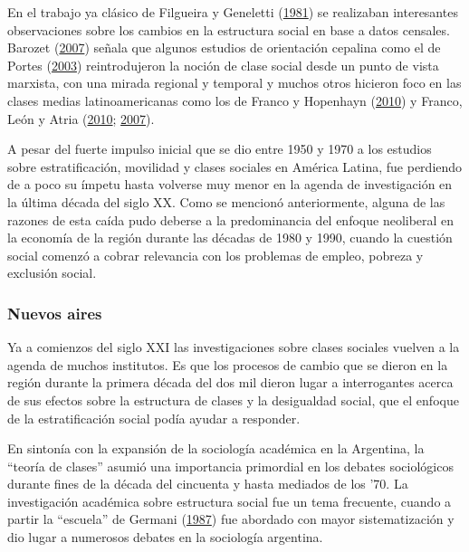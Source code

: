 \documentclass[
]{article}
\begin{document}
En el trabajo ya clásico de Filgueira y Geneletti (\protect\hyperlink{ref-Filgueira1981}{1981}) se realizaban interesantes observaciones sobre los cambios en la estructura social en base a datos censales. Barozet (\protect\hyperlink{ref-Barozet2007}{2007}) señala que algunos estudios de orientación cepalina como el de Portes (\protect\hyperlink{ref-Portes2003}{2003}) reintrodujeron la noción de clase social desde un punto de vista marxista, con una mirada regional y temporal y muchos otros hicieron foco en las clases medias latinoamericanas como los de Franco y Hopenhayn (\protect\hyperlink{ref-Franco2010}{2010}) y Franco, León y Atria (\protect\hyperlink{ref-Franco2010a}{2010}; \protect\hyperlink{ref-Franco2007}{2007}).

A pesar del fuerte impulso inicial que se dio entre 1950 y 1970 a los estudios sobre estratificación, movilidad y clases sociales en América Latina, fue perdiendo de a poco su ímpetu hasta volverse muy menor en la agenda de investigación en la última década del siglo XX. Como se mencionó anteriormente, alguna de las razones de esta caída pudo deberse a la predominancia del enfoque neoliberal en la economía de la región durante las décadas de 1980 y 1990, cuando la cuestión social comenzó a cobrar relevancia con los problemas de empleo, pobreza y exclusión social.

\hypertarget{nuevos-aires}{%
\subsubsection{Nuevos aires}\label{nuevos-aires}}

Ya a comienzos del siglo XXI las investigaciones sobre clases sociales vuelven a la agenda de muchos institutos. Es que los procesos de cambio que se dieron en la región durante la primera década del dos mil dieron lugar a interrogantes acerca de sus efectos sobre la estructura de clases y la desigualdad social, que el enfoque de la estratificación social podía ayudar a responder.

En sintonía con la expansión de la sociología académica en la Argentina, la ``teoría de clases'' asumió una importancia primordial en los debates sociológicos durante fines de la década del cincuenta y hasta mediados de los '70. La investigación académica sobre estructura social fue un tema frecuente, cuando a partir la ``escuela'' de Germani (\protect\hyperlink{ref-Germani1987}{1987}) fue abordado con mayor sistematización y dio lugar a numerosos debates en la sociología argentina.
\end{document}
